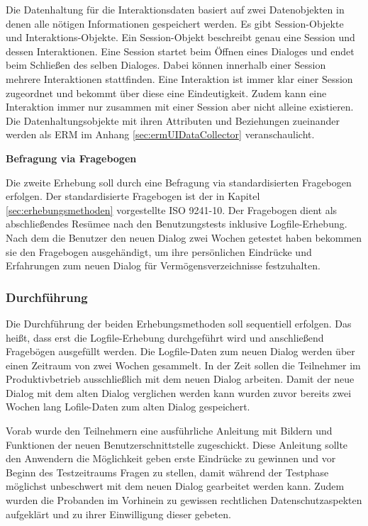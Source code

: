 Die Datenhaltung für die Interaktionsdaten basiert auf zwei Datenobjekten in denen alle nötigen Informationen gespeichert werden. Es gibt Session-Objekte und Interaktions-Objekte. Ein Session-Objekt beschreibt genau eine Session und dessen Interaktionen. Eine Session startet beim Öffnen eines Dialoges und endet beim Schließen des selben Dialoges. Dabei können innerhalb einer Session mehrere Interaktionen stattfinden. Eine Interaktion ist immer klar einer Session zugeordnet und bekommt über diese eine Eindeutigkeit. Zudem kann eine Interaktion immer nur zusammen mit einer Session aber nicht alleine existieren. Die Datenhaltungsobjekte mit ihren Attributen und Beziehungen zueinander werden als \gls{ERM} im Anhang \ref{sec:ermUIDataCollector} veranschaulicht.

\textbf{Befragung via Fragebogen}

Die zweite Erhebung soll durch eine Befragung via standardisierten Fragebogen erfolgen. Der standardisierte Fragebogen ist der in Kapitel \ref{sec:erhebungsmethoden} vorgestellte ISO 9241-10. Der Fragebogen dient als abschließendes Resümee nach den Benutzungstests inklusive Logfile-Erhebung. Nach dem die Benutzer den neuen Dialog zwei Wochen getestet haben bekommen sie den Fragebogen ausgehändigt, um ihre persönlichen Eindrücke und Erfahrungen zum neuen Dialog für Vermögensverzeichnisse festzuhalten.


\subsubsection{Durchführung}
Die Durchführung der beiden Erhebungsmethoden soll sequentiell erfolgen. Das heißt, dass erst die Logfile-Erhebung durchgeführt wird und anschließend Fragebögen ausgefüllt werden. Die Logfile-Daten zum neuen Dialog werden über einen Zeitraum von zwei Wochen gesammelt. In der Zeit sollen die Teilnehmer im Produktivbetrieb ausschließlich mit dem neuen Dialog arbeiten. Damit der neue Dialog mit dem alten Dialog verglichen werden kann wurden zuvor bereits zwei Wochen lang Lofile-Daten zum alten Dialog gespeichert. 

Vorab wurde den Teilnehmern eine ausführliche Anleitung mit Bildern und Funktionen der neuen Benutzerschnittstelle zugeschickt. Diese Anleitung sollte den Anwendern die Möglichkeit geben erste Eindrücke zu gewinnen und vor Beginn des Testzeitraums Fragen zu stellen, damit während der Testphase möglichst unbeschwert mit dem neuen Dialog gearbeitet werden kann. Zudem wurden die Probanden im Vorhinein zu gewissen rechtlichen Datenschutzaspekten aufgeklärt und zu ihrer Einwilligung dieser gebeten.

